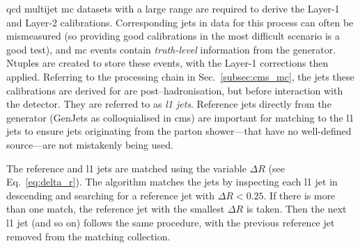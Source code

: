 \acrshort{qcd} multijet \acrshort{mc} datasets with a large \pt range are required to derive the Layer-1 and Layer-2 calibrations. Corresponding \glspl{jet} in data for this process can often be mismeasured (so providing good calibrations in the most difficult scenario is a good test), and \acrshort{mc} events contain \emph{truth-level} information from the generator. Ntuples are created to store these events, with the Layer-1 corrections then applied. Referring to the processing chain in Sec.~\ref{subsec:cms_mc}, the \glspl{jet} these calibrations are derived for are post--hadronisation, but before interaction with the detector. They are referred to as \emph{\acrfull{l1} \glspl{jet}}. Reference \glspl{jet} directly from the generator (GenJets as colloquialised in \acrshort{cms}) are important for matching to the \acrshort{l1} \glspl{jet} to ensure \glspl{jet} originating from the parton shower---that have no well-defined source---are not mistakenly being used.

The reference and \acrshort{l1} \glspl{jet} are matched using the variable $\Delta R$ (see Eq.~\ref{eq:delta_r}). The algorithm matches the \glspl{jet} by inspecting each \acrshort{l1} \gls{jet} in descending \pt and searching for a reference \gls{jet} with $\Delta R < \text{0.25}$. If there is more than one match, the reference \gls{jet} with the smallest $\Delta R$ is taken. Then the next \acrshort{l1} jet (and so on) follows the same procedure, with the previous reference \gls{jet} removed from the matching collection.

